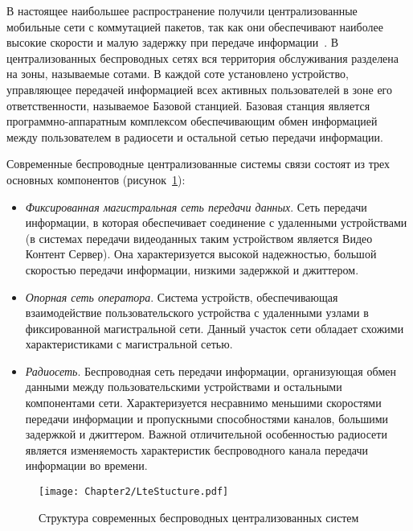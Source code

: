 В настоящее наибольшее распространение получили централизованные мобильные сети с коммутацией пакетов, так как они обеспечивают наиболее высокие скорости и малую задержку при передаче информации~\cite{Cisco}. В централизованных беспроводных сетях вся территория обслуживания разделена на зоны, называемые сотами. В каждой соте установлено устройство, управляющее передачей информацией всех активных пользователей в зоне его ответственности, называемое Базовой станцией. Базовая станция является программно-аппаратным комплексом обеспечивающим обмен информацией между пользователем в радиосети и остальной сетью передачи информации.

Современные беспроводные централизованные системы связи состоят из трех основных компонентов (рисунок~\ref{fig:LteStructure}):
\begin{itemize}
  \item \textit{Фиксированная магистральная сеть передачи данных}. Сеть передачи информации, в которая обеспечивает соединение с удаленными устройствами (в системах передачи видеоданных таким устройством является Видео Контент Сервер). Она характеризуется высокой надежностью, большой скоростью передачи информации, низкими задержкой и джиттером.
  \item \textit{Опорная сеть оператора}. Система устройств, обеспечивающая взаимодействие пользовательского устройства с удаленными узлами в фиксированной магистральной сети. Данный участок сети обладает схожими характеристиками с магистральной сетью.
  \item \textit{Радиосеть}. Беспроводная сеть передачи информации, организующая обмен данными между пользовательскими устройствами и остальными компонентами сети. Характеризуется несравнимо меньшими скоростями передачи информации и пропускными способностями каналов, большими задержкой и джиттером. Важной отличительной особенностью радиосети является изменяемость характеристик беспроводного канала передачи информации во времени.
\end{itemize}

\begin{figure}[htbp]
\begin{center}
\texttt{[image: Chapter2/LteStucture.pdf]}
\caption{Структура современных беспроводных централизованных систем}
\label{fig:LteStructure}
\end{center}
\end{figure}

